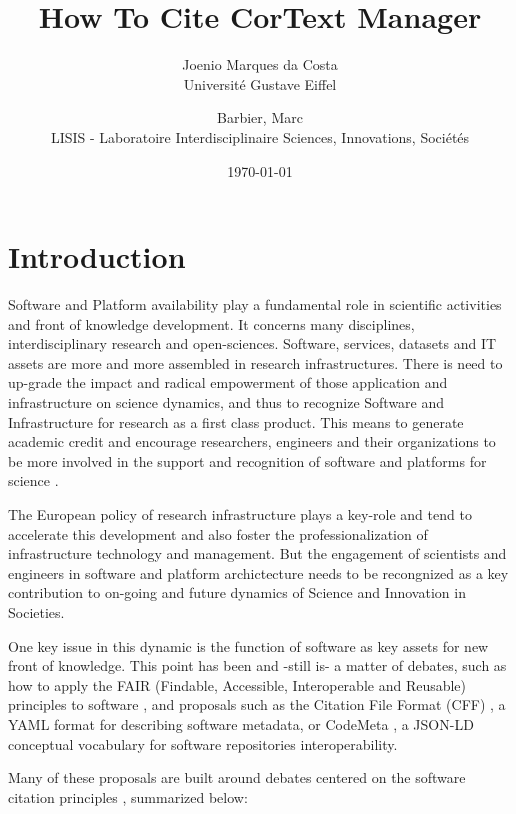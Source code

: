 \documentclass{article}
\title{
  How To Cite CorText Manager
}
\author{
  Joenio Marques da Costa\\
  Université Gustave Eiffel
  \and
  Barbier, Marc\\
  LISIS - Laboratoire Interdisciplinaire Sciences, Innovations, Sociétés
}
\date{\today}
\begin{document}
\maketitle

\section{Introduction}

Software and Platform availability play a fundamental role in scientific
activities and front of knowledge development. It concerns many disciplines,
interdisciplinary research and open-sciences. Software, services, datasets and
IT assets are more and more assembled in research infrastructures. There is
need to up-grade the impact and radical empowerment of those application and
infrastructure on science dynamics, and thus to recognize Software and
Infrastructure for research as a first class product.  This means to generate
academic credit and encourage researchers, engineers and their organizations to
be more involved in the support and recognition of software and platforms for
science \cite{alliez_attributing_2020}.

The European policy of research infrastructure plays a key-role and tend to
accelerate this development and also foster the professionalization  of
infrastructure technology and management. But the engagement of scientists and
engineers in software and platform archictecture needs to be recongnized as a
key contribution to on-going and future dynamics of Science and Innovation in
Societies.

One key issue in this dynamic is the function of software as key assets for new
front of knowledge. This point has been and -still is- a matter of debates,
such as how to apply the FAIR (Findable, Accessible, Interoperable and
Reusable) principles to software \cite{noauthor_fair_nodate}, and proposals
such as the Citation File Format (CFF) \cite{chue_hong_software_2019}, a YAML
format for describing software metadata, or CodeMeta
\cite{druskat_citation_2019}, a JSON-LD conceptual vocabulary for software
repositories interoperability.

Many of these proposals are built around debates centered on the software
citation principles \cite{smith_software_2016}, summarized below:
\end{document}
